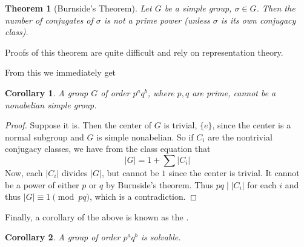\documentclass[12pt]{article}
\newtheorem{thm}{Theorem}
\newtheorem{cor}{Corollary}
\begin{document}
\begin{thm}[Burnside's Theorem]

Let $G$ be a simple group, $\sigma\in G$. Then the number of conjugates of $\sigma$ is not a prime power (unless $\sigma$ is its own conjugacy class).
\end{thm}

Proofs of this theorem are quite difficult and rely on representation theory.

From this we immediately get
\begin{cor} A group $G$ of order $p^a q^b$, where $p,q$ are prime, cannot be a nonabelian simple group.
\end{cor}
\begin{proof}
Suppose it is. Then the center of $G$ is trivial, $\{e\}$, since the center is a normal subgroup and $G$ is simple nonabelian. So if $C_i$ are the nontrivial conjugacy classes, we have from the class equation that
\[\lvert G\rvert = 1+\sum\lvert C_i\rvert\]
Now, each $\lvert C_i\rvert$ divides $\lvert G\rvert$, but cannot be $1$ since the center is trivial. It cannot be a power of either $p$ or $q$ by Burnside's theorem. Thus $pq \mid \lvert C_i\rvert$ for each $i$ and thus $\lvert G\rvert\equiv 1\pmod {pq}$, which is a contradiction.
\end{proof}

Finally, a corollary of the above is known as the .
\begin{cor} A group of order $p^aq^b$ is solvable.
\end{cor}
\end{document}
